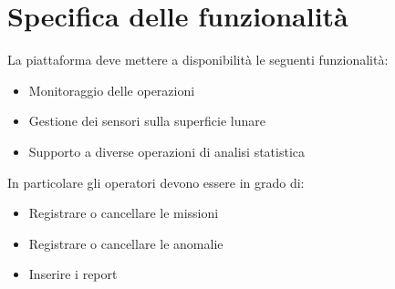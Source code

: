 \section{Specifica delle funzionalità}
La piattaforma deve mettere a disponibilità le seguenti funzionalità:
\begin{itemize}
  \item Monitoraggio delle operazioni
  \item Gestione dei sensori sulla superficie lunare
  \item Supporto a diverse operazioni di analisi statistica
\end{itemize}
In particolare gli operatori devono essere in grado di:
\begin{itemize}
  \item Registrare o cancellare le missioni
  \item Registrare o cancellare le anomalie
  \item Inserire i report
\end{itemize}
